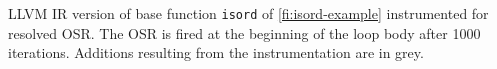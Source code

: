 \label{fig:isordfrom} LLVM IR version of base function {\tt isord} of \myfigure\ref{fi:isord-example} instrumented for resolved OSR. The OSR is fired at the beginning of the loop body after 1000 iterations. Additions resulting from the instrumentation are in grey.
